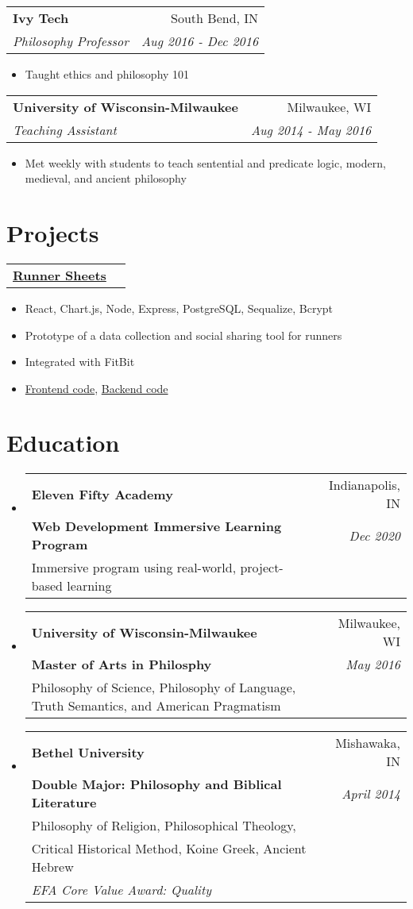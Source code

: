 \documentclass[letterpaper,11pt]{article}
\makeatletter
\newcommand{\resumeItem}[1]{
  \item\small{#1}
}
\newcommand{\resumeHeading}[4]{
    \begin{tabular*}{0.99\textwidth}[t]{l@{\extracolsep{\fill}}r}
      \textbf{#1} & #2 \\
      \textit{\small#3} & \textit{\small #4} \\
    \end{tabular*}\vspace{-5pt}
}
\newcommand{\projectHeading}[1]{
    \begin{tabular*}{0.99\textwidth}[t]{l@{\extracolsep{\fill}}r}
      \textbf{#1} \\
    \end{tabular*}\vspace{-5pt}
}
\newcommand{\educationEntryWithSevenPlaceholders}[7]{
  \vspace{-1pt}\item
    \begin{tabular*}{0.97\textwidth}[t]{l@{\extracolsep{\fill}}r}
      \textbf{#1} & #2 \\
      \textbf{\small#3} & \textit{\small #4} \\
      #5 \\
      #6 \\
      #7 \\
    \end{tabular*}\vspace{-5pt}
}
\newcommand{\educationEntryWithFivePlaceholders}[5]{
  \vspace{-1pt}\item
    \begin{tabular*}{0.97\textwidth}[t]{l@{\extracolsep{\fill}}r}
      \textbf{#1} & #2 \\
      \textbf{\small#3} & \textit{\small #4} \\
      #5 \\
    \end{tabular*}\vspace{-5pt}
}
\newcommand{\resumeSubHeadingListStart}{\begin{itemize}[leftmargin=*]}
\newcommand{\resumeSubHeadingListEnd}{\end{itemize}}
\newcommand{\resumeItemListStart}{\begin{itemize}}
\newcommand{\resumeItemListEnd}{\end{itemize}\vspace{-5pt}}
\makeatother
\begin{document}
  \resumeHeading{Ivy Tech}{South Bend, IN}{Philosophy Professor}{Aug 2016 - Dec 2016}
      \resumeItemListStart
        \resumeItem{Taught ethics and philosophy 101}
      \resumeItemListEnd

  \resumeHeading{University of Wisconsin-Milwaukee}{Milwaukee, WI}{Teaching Assistant}{Aug 2014 - May 2016}
      \resumeItemListStart
        \resumeItem{Met weekly with students to teach sentential and predicate logic, modern, medieval, and ancient philosophy}
      \resumeItemListEnd

\section{Projects}
  \projectHeading{\color{RoyalBlue}\href{https://runnersheetsclient.herokuapp.com}{Runner Sheets}}
      \resumeItemListStart
        \resumeItem{React, Chart.js, Node, Express, PostgreSQL, Sequalize, Bcrypt}
        \resumeItem{Prototype of a data collection and social sharing tool for runners}
        \resumeItem{Integrated with FitBit}
        \resumeItem{\color{RoyalBlue}\href{https://github.com/jonnyschult/runnersheetsClient}{Frontend code}, \color{RoyalBlue}\href{https://github.com/jonnyschult/runnersheetsServer}{Backend code}}
      \resumeItemListEnd

\section{Education}
  \resumeSubHeadingListStart
    \educationEntryWithFivePlaceholders
      {Eleven Fifty Academy}
      {Indianapolis, IN}
      {Web Development Immersive Learning Program}
      {Dec 2020}
      {Immersive program using real-world, project-based learning}
  \resumeSubHeadingListEnd

  \resumeSubHeadingListStart
    \educationEntryWithFivePlaceholders
      {University of Wisconsin-Milwaukee}
      {Milwaukee, WI}
      {Master of Arts in Philosphy}
      {May 2016}
      {Philosophy of Science, Philosophy of Language, Truth Semantics, and American Pragmatism}
  \resumeSubHeadingListEnd

  \resumeSubHeadingListStart
    \educationEntryWithSevenPlaceholders
      {Bethel University}
      {Mishawaka, IN}
      {Double Major: Philosophy and Biblical Literature}
      {April 2014}
      {Philosophy of Religion, Philosophical Theology,}
      {Critical Historical Method, Koine Greek, Ancient Hebrew}
      {\textit{EFA Core Value Award: Quality}}
  \resumeSubHeadingListEnd
\end{document}
